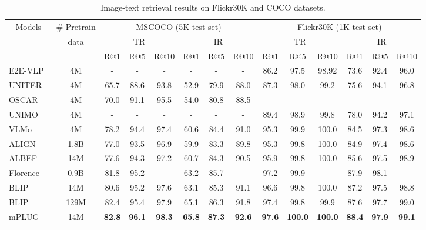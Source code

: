 \documentclass[11pt]{article}
\begin{document}
\begin{table*}
\setlength\tabcolsep{4pt}
\centering
\small
\begin{tabular}{l|c|cccccc|cccccc}
\toprule
\multicolumn{1}{c|}{\multirow{2}{*}{Models}}      &
\multicolumn{1}{c|}{\# Pretrain} &
\multicolumn{6}{c|}{MSCOCO (5K test set)} & \multicolumn{6}{c}{Flickr30K (1K test set)} \\
      &  data & \multicolumn{3}{c}{TR} & \multicolumn{3}{c|}{IR} & \multicolumn{3}{c}{TR} & \multicolumn{3}{c}{IR}          \\
\midrule
&&R@1&R@5&R@10&R@1&R@5&R@10&R@1&R@5&R@10&R@1&R@5&R@10 \\
E2E-VLP~\cite{xu2021e2e}& 4M     &-& -&-&-&-&- & 86.2 &97.5 &98.92&73.6 & 92.4 &96.0 \\
UNITER~\cite{chen2020uniter} & 4M     & 65.7&88.6&93.8&52.9&79.9&88.0&87.3& 98.0&99.2&75.6&94.1&96.8  \\
OSCAR~\cite{li2020oscar} & 4M  & 70.0&91.1&95.5&54.0&80.8&88.5&-& -&-&-&-&-   \\
UNIMO ~\cite{li2020unimo} & 4M     &-& -&-&-&-&- & 89.4 & 98.9& 99.8 &78.0 &94.2& 97.1\\
VLMo ~\cite{wang2021vlmo} & 4M & 78.2& 94.4& 97.4& 60.6& 84.4& 91.0& 95.3& 99.9& 100.0& 84.5& 97.3& 98.6 \\
ALIGN~\cite{jia2021scaling} & 1.8B  & 77.0&93.5&96.9&59.9&83.3&89.8&95.3& 99.8&100.0&84.9&97.4&98.6   \\
ALBEF ~\cite{li2021align} & 14M & 77.6&94.3&97.2&60.7&84.3&90.5&95.9& 99.8&100.0&85.6&97.5&98.9                 \\
Florence ~\cite{yuan2021florence} & 0.9B & 81.8&95.2&-&63.2&85.7&-&97.2& 99.9&-&87.9&98.1&-                 \\
BLIP ~\cite{li2022blip}& 14M & 80.6 &95.2&97.6&63.1&85.3&91.1&96.6& 99.8&100.0&87.2&97.5&98.8                 \\
BLIP ~\cite{li2022blip}& 129M & 82.4 &95.4&97.9&65.1&86.3&91.8&97.4& 99.8&99.9&87.6&97.7&99.0                 \\
\midrule
mPLUG & 14M  & \textbf{82.8} &\textbf{96.1}&\textbf{98.3}&\textbf{65.8}&\textbf{87.3}&\textbf{92.6}&\textbf{97.6}& \textbf{100.0}&\textbf{100.0}&\textbf{88.4}&\textbf{97.9}&\textbf{99.1}  \\
\bottomrule
\end{tabular}          \\
\caption{Image-text retrieval results on Flickr30K and COCO datasets.}
\label{table:retrieval}
\end{table*}
\end{document}
